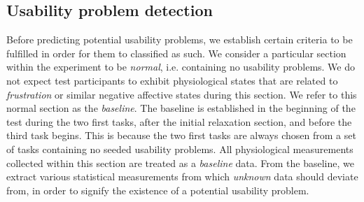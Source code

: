 
\subsection{Usability problem detection}
Before predicting potential usability problems, we establish certain criteria to be fulfilled in order for them to
classified as such.  We consider a particular section within the experiment to be \textit{normal}, i.e. containing no
usability problems.  We do not expect test participants to exhibit physiological states that are related to
\textit{frustration} or similar negative affective states during this section. We refer to this normal section as the
\textit{baseline}. The baseline is established in the beginning of the test during the two first tasks, after the
initial relaxation section, and before the third task begins. This is because the two first tasks are always chosen from
a set of tasks containing no seeded usability problems. All physiological measurements collected within this section are
treated as a \textit{baseline} data.  From the baseline, we extract various statistical measurements from which
\textit{unknown} data should deviate from, in order to signify the existence of a potential usability problem.

